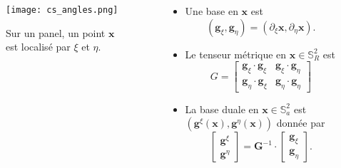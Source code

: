 \documentclass[11pt]{beamer}
\begin{document}
\begin{frame}{}
\begin{columns}
\begin{figure}[htbp]
\begin{center}
\texttt{[image: cs\_angles.png]}
\end{center}
\caption{Sur un panel, un point $\mathbf{x}$ est localisé par $\xi$ et $\eta$.}
\end{figure}
\begin{itemize}
\item Une base en $\mathbf{x}$ est $$(\mathbf{g}_{\xi}, \mathbf{g}_{\eta}) = (\partial_{\xi} \mathbf{x}, \partial_{\eta} \mathbf{x}).$$

\item Le tenseur métrique en $\mathbf{x} \in \mathbb{S}_R^2$ est
\begin{equation*}
G=\begin{bmatrix}
\mathbf{g}_{\xi} \cdot \mathbf{g}_{\xi} & \mathbf{g}_{\xi} \cdot \mathbf{g}_{\eta} \\
\mathbf{g}_{\eta} \cdot \mathbf{g}_{\xi} & \mathbf{g}_{\eta} \cdot \mathbf{g}_{\eta} 
\end{bmatrix}
\end{equation*}

\item La base duale en $\mathbf{x} \in \mathbb{S}^2_a $ est $(\mathbf{g}^\xi(\mathbf{x}),\mathbf{g}^\eta(\mathbf{x}))$ donnée par
$$
\begin{bmatrix}
\mathbf{g}^{\xi} \\ \mathbf{g}^{\eta} 
\end{bmatrix}
=
\mathbf{G}^{-1} \cdot
\begin{bmatrix}
\mathbf{g}_{\xi} \\ \mathbf{g}_{\eta} 
\end{bmatrix}.
$$
\end{itemize}
\end{columns}
\end{frame}
\end{document}
